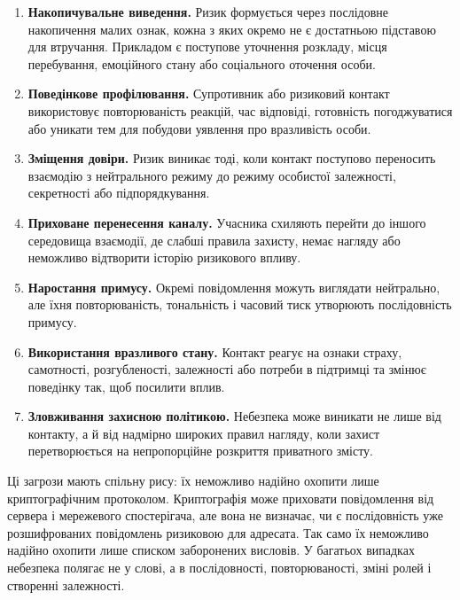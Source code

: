 \begin{enumerate}
  \item \textbf{Накопичувальне виведення.} Ризик формується через послідовне накопичення малих ознак, кожна з яких окремо не є достатньою підставою для втручання. Прикладом є поступове уточнення розкладу, місця перебування, емоційного стану або соціального оточення особи.
  \item \textbf{Поведінкове профілювання.} Супротивник або ризиковий контакт використовує повторюваність реакцій, час відповіді, готовність погоджуватися або уникати тем для побудови уявлення про вразливість особи.
  \item \textbf{Зміщення довіри.} Ризик виникає тоді, коли контакт поступово переносить взаємодію з нейтрального режиму до режиму особистої залежності, секретності або підпорядкування.
  \item \textbf{Приховане перенесення каналу.} Учасника схиляють перейти до іншого середовища взаємодії, де слабші правила захисту, немає нагляду або неможливо відтворити історію ризикового впливу.
  \item \textbf{Наростання примусу.} Окремі повідомлення можуть виглядати нейтрально, але їхня повторюваність, тональність і часовий тиск утворюють послідовність примусу.
  \item \textbf{Використання вразливого стану.} Контакт реагує на ознаки страху, самотності, розгубленості, залежності або потреби в підтримці та змінює поведінку так, щоб посилити вплив.
  \item \textbf{Зловживання захисною політикою.} Небезпека може виникати не лише від контакту, а й від надмірно широких правил нагляду, коли захист перетворюється на непропорційне розкриття приватного змісту.
\end{enumerate}

Ці загрози мають спільну рису: їх неможливо надійно охопити лише криптографічним протоколом. Криптографія може приховати повідомлення від сервера і мережевого спостерігача, але вона не визначає, чи є послідовність уже розшифрованих повідомлень ризиковою для адресата. Так само їх неможливо надійно охопити лише списком заборонених висловів. У багатьох випадках небезпека полягає не у слові, а в послідовності, повторюваності, зміні ролей і створенні залежності.

